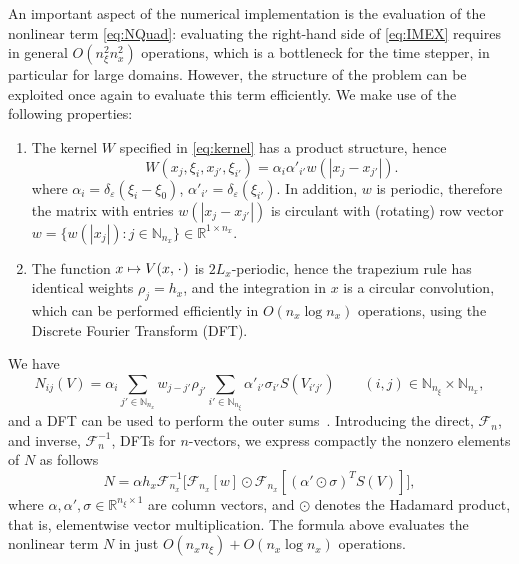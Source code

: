 \documentclass[a4paper,final]{siamart190516}
\newcommand{\Rb}{\mathbb{R}}
\newcommand{\Nb}{\mathbb{N}}
\newcommand{\Ib}{\mathbb{I}}
\newcommand{\cF}{\mathcal{F}}
\newcommand{\ep}{\varepsilon}
\begin{document}
An important aspect of the numerical implementation is the evaluation of the
nonlinear term \eqref{eq:NQuad}: evaluating the right-hand side of
\eqref{eq:IMEX} requires in general $O(n^2_\xi n^2_x)$ operations, which is a
bottleneck for the time stepper, in particular for large domains. However, the
structure of the problem can be exploited once again to evaluate this term
efficiently. We make use of the following properties: 
\begin{enumerate}
  \item The kernel $W$ specified in \eqref{eq:kernel} has a product structure,
    hence
    \[
      W(x_j,\xi_i,x_{j'},\xi_{i'}) = \alpha_i \alpha'_{i'}
      w(|x_j-x_{j'}|). 
    \]
    where $\alpha_i = \delta_\ep(\xi_i-\xi_0)$, $\alpha'_{i'} = \delta_\ep(\xi_{i'})$.
    In addition, $w$ is periodic, therefore the matrix with entries $w(|x_j -
    x_{j'}|)$ is circulant with (rotating) row vector $w 
    = \{w(|x_j|) \colon j \in \Nb_{n_x}\}  \in \Rb^{1 \times n_x}$.
   \item The function $x \mapsto V(x,{\mkern 2mu\cdot\mkern 2mu})$ is $2L_x$-periodic, hence the trapezium
     rule has identical weights $\rho_j = h_x$, and the integration
     in $x$ is a circular convolution, which can be performed efficiently in $O(n_x
     \log n_x)$ operations, using the Discrete Fourier Transform (DFT).
\end{enumerate}
We have
\begin{equation}\label{eq:NSlow}
  N_{ij}(V) = \alpha_i \sum_{j' \in \Nb_{n_x}} w_{j-j'} \rho_{j'}
  \sum_{i' \in \Nb_{n_\xi}} \alpha'_{i'} \sigma_{i'} S(V_{i'j'})
  \qquad
  (i,j) \in \Nb_{n_\xi} \times \Nb_{n_x},
\end{equation}
and a DFT can be used to perform the outer
sums~\cite{coombes2012interface,Rankin2014}.
Introducing the direct, $\cF_n$, and inverse, $\cF_n^{-1}$, DFTs for $n$-vectors, we express compactly the nonzero elements of $N$ as
follows
\begin{equation}\label{eq:NFast}
  N = \alpha h_x \cF^{-1}_{n_x} 
   \big[
     \cF_{n_x}[w] \odot  \cF_{n_x}[ (\alpha' \odot \sigma)^T S(V)]
   \big],
\end{equation}
where $\alpha, \alpha', \sigma \in \Rb^{n_\xi \times 1}$
are column vectors, and $\odot$ denotes the Hadamard product, that is, elementwise
vector multiplication. The formula above evaluates the
nonlinear term $N$ in just 
$O(n_xn_\xi) + O(n_x \log n_x)$ operations.
\end{document}
